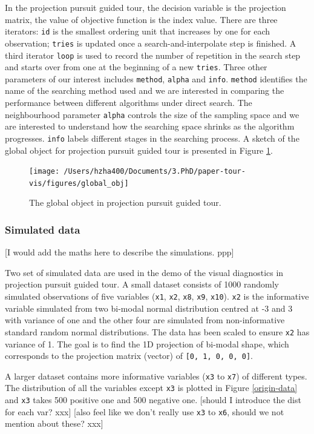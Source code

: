 \documentclass[12pt]{article}
\begin{document}
In the projection pursuit guided tour, the decision variable is the
projection matrix, the value of objective function is the index value.
There are three iterators: \texttt{id} is the smallest ordering unit
that increases by one for each observation; \texttt{tries} is updated
once a search-and-interpolate step is finished. A third iterator
\texttt{loop} is used to record the number of repetition in the search
step and starts over from one at the beginning of a new \texttt{tries}.
Three other parameters of our interest includes \texttt{method},
\texttt{alpha} and \texttt{info}. \texttt{method} identifies the name of
the searching method used and we are interested in comparing the
performance between different algorithms under direct search. The
neighbourhood parameter \texttt{alpha} controls the size of the sampling
space and we are interested to understand how the searching space
shrinks as the algorithm progresses. \texttt{info} labels different
stages in the searching process. A sketch of the global object for
projection pursuit guided tour is presented in Figure \ref{fig:glb-obj}.

\begin{figure}
\texttt{[image: /Users/hzha400/Documents/3.PhD/paper-tour-vis/figures/global\_obj]} \caption{\label{glb-obj}The global object in projection pursuit guided tour.}\label{fig:glb-obj}
\end{figure}

\hypertarget{simulated-data}{%
\subsubsection{Simulated data}\label{simulated-data}}

{[}I would add the maths here to describe the simulations. ppp{]}

Two set of simulated data are used in the demo of the visual diagnostics
in projection pursuit guided tour. A small dataset consists of 1000
randomly simulated observations of five variables (\texttt{x1},
\texttt{x2}, \texttt{x8}, \texttt{x9}, \texttt{x10}). \texttt{x2} is the
informative variable simulated from two bi-modal normal distribution
centred at -3 and 3 with variance of one and the other four are
simulated from non-informative standard random normal distributions. The
data has been scaled to ensure \texttt{x2} has variance of 1. The goal
is to find the 1D projection of bi-modal shape, which corresponds to the
projection matrix (vector) of \texttt{{[}0,\ 1,\ 0,\ 0,\ 0{]}}.

A larger dataset contains more informative variables (\texttt{x3} to
\texttt{x7}) of different types. The distribution of all the variables
except \texttt{x3} is plotted in Figure \ref{origin-data} and
\texttt{x3} takes 500 positive one and 500 negative one. {[}should I
introduce the dist for each var? xxx{]} {[}also feel like we don't
really use \texttt{x3} to \texttt{x6}, should we not mention about
these? xxx{]}
\end{document}
